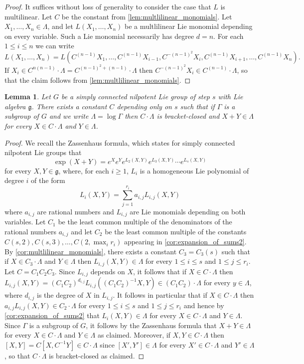 \documentclass[11pt]{article}
\numberwithin{equation}{section}
\theoremstyle{plain}
\newtheorem{lemma}[thm]{Lemma}
\theoremstyle{definition}
\theoremstyle{remark}
\numberwithin{equation}{section}
\numberwithin{equation}{section}
\begin{document}
\begin{proof}
It suffices without loss of generality to consider the case that $L$ is multilinear.
Let $C$ be the constant from \cref{lem:multlilinear_monomials}. Let $X_1,\ldots,X_n \in \Lambda$, and let $L(X_1,\ldots,X_n)$ be a multlilinear Lie monomial depending on every variable. Such a Lie monomial necessarily has degree $d=n$. For each $1\leq i \leq n$ we can write
\[
L(X_1,\ldots,X_n) = L(C^{(n-1)}X_1,\ldots,C^{(n-1)}X_{i-1},C^{-(n-1)^2}X_i,C^{(n-1)}X_{i+1},\ldots,C^{(n-1)}X_n).
\]
If $X_i \in C^{n(n-1)}\cdot \Lambda=C^{(n-1)^2+(n-1)} \cdot \Lambda$ then $C^{-(n-1)^2}X_i \in C^{(n-1)}\cdot \Lambda$, so that the claim follows from \cref{lem:multlilinear_monomials}.
\end{proof}



\begin{lemma}
\label{lem:good_sublattice}
Let $G$ be a simply connected nilpotent Lie group of step $s$ with Lie algebra $\mathfrak{g}$. There exists a constant $C$ depending only on $s$ such that if $\Gamma$ is a subgroup of $G$ and we write $\Lambda = \log \Gamma$ then $C\cdot \Lambda$ is bracket-closed and $X+Y \in \Lambda$ for every $X\in C\cdot \Lambda$ and $Y\in \Lambda$. 
\end{lemma}

\begin{proof}
We recall the Zassenhaus formula, which states for simply connected nilpotent Lie groups that
\[
\exp(X+Y) = e^X e^Y e^{L_2(X,Y)}e^{L_3(X,Y)}\cdots e^{L_s(X,Y)}
\]
for every $X,Y\in \mathfrak{g}$, where, for each $i\geq 1$, $L_i$ is a homogeneous Lie polynomial of degree $i$
of the form
\[
L_i(X,Y) = \sum_{j=1}^{r_i} a_{i,j} L_{i,j}(X,Y)
\]
where $a_{i,j}$ are rational numbers and $L_{i,j}$ are Lie monomials depending on both variables.
%
%
%
Let $C_1$ be the least common multiple of the denominators of the rational numbers $a_{i,j}$ and let $C_2$ be the least common multiple of the constants $C(s,2),C(s,3),\ldots,C(2,\max_i r_i)$ appearing in \cref{cor:expansion_of_sums2}. By \cref{cor:multlilinear_monomials}, there exists a constant $C_3=C_3(s)$ such that if $X\in C_3 \cdot \Lambda$ and $Y\in \Lambda$ then $L_{i,j}(X,Y)\in \Lambda$ for every $1\leq i \leq s$ and $1\leq j \leq r_i$. Let $C=C_1C_2C_3$. Since $L_{i,j}$ depends on $X$, it follows that if $X \in C \cdot \Lambda$ then $L_{i,j}(X,Y)=(C_1C_2)^{d_{i,j}}L_{i,j}((C_1C_2)^{-1}X,Y) \in (C_1C_2)\cdot \Lambda$ for every $y\in \Lambda$, where $d_{i,j}$ is the degree of $X$ in $L_{i,j}$. It follows in particular that if $X\in C\cdot \Lambda$ then $a_{i,j} L_{i,j}(X,Y) \in C_2 \cdot \Lambda$ for every $1\leq i \leq s$ and $1\leq j \leq r_i$ and hence by \cref{cor:expansion_of_sums2} that $L_i(X,Y) \in \Lambda$ for every $X\in C \cdot \Lambda$ and $Y\in \Lambda$. Since $\Gamma$ is a subgroup of $G$, it follows by the Zassenhaus formula that $X+Y\in \Lambda$ for every $X\in C\cdot \Lambda$ and $Y\in \Lambda$ as claimed. Moreover, if $X,Y\in C\cdot \Lambda$ then $[X,Y]=C[X,C^{-1}Y] \in C\cdot \Lambda$ since $[X',Y']\in \Lambda$ for every $X'\in C\cdot \Lambda$ and $Y'\in \Lambda$, so that $C\cdot \Lambda$ is bracket-closed as claimed. 
\end{proof}
\end{document}
